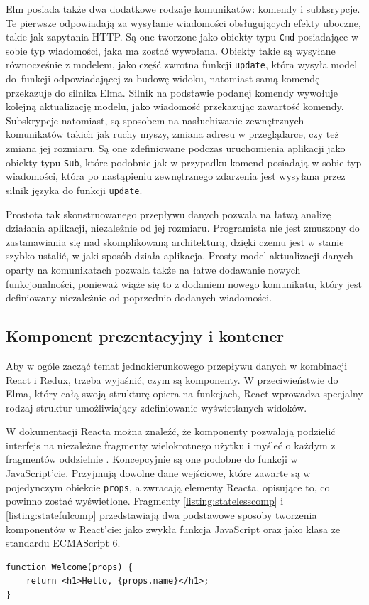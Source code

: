 Elm posiada także dwa dodatkowe rodzaje komunikatów: komendy i subksrypcje. Te pierwsze odpowiadają za wysyłanie wiadomości obsługujących efekty uboczne, takie jak zapytania HTTP. Są one tworzone jako obiekty typu \lstinline[style=elm-style]{Cmd} posiadające w sobie typ wiadomości, jaka ma zostać wywołana. Obiekty takie są wysyłane równocześnie z modelem, jako część zwrotna funkcji \lstinline{update}, która wysyła model do~funkcji odpowiadającej za budowę widoku, natomiast samą komendę przekazuje do silnika Elma. Silnik na podstawie podanej komendy wywołuje kolejną aktualizację modelu, jako wiadomość przekazując zawartość komendy. Subskrypcje natomiast, są sposobem na nasłuchiwanie zewnętrznych komunikatów takich jak ruchy myszy, zmiana adresu w przeglądarce, czy też zmiana jej rozmiaru. Są one zdefiniowane podczas uruchomienia aplikacji jako obiekty typu \lstinline[style=elm-style]{Sub}, które podobnie jak w przypadku komend posiadają w sobie typ wiadomości, która po nastąpieniu zewnętrznego zdarzenia jest wysyłana przez silnik języka do funkcji \lstinline{update}.

Prostota tak skonstruowanego przepływu danych pozwala na łatwą analizę działania aplikacji, niezależnie od jej rozmiaru. Programista nie jest zmuszony do zastanawiania się nad skomplikowaną architekturą, dzięki czemu jest w stanie szybko ustalić, w jaki sposób działa aplikacja. Prosty model aktualizacji danych oparty na komunikatach pozwala także na łatwe dodawanie nowych funkcjonalności, ponieważ wiąże się to z dodaniem nowego komunikatu, który jest definiowany niezależnie od poprzednio dodanych wiadomości.

\subsection{Komponent prezentacyjny i kontener}
Aby w ogóle zacząć temat jednokierunkowego przepływu danych w kombinacji React i Redux, trzeba wyjaśnić, czym są komponenty. W przeciwieństwie do Elma, który całą swoją strukturę opiera na funkcjach, React wprowadza specjalny rodzaj struktur umożliwiający zdefiniowanie wyświetlanych widoków.

W dokumentacji Reacta można znaleźć, że komponenty pozwalają podzielić interfejs na niezależne fragmenty wielokrotnego użytku i myśleć o każdym z fragmentów oddzielnie \cite{reactDocs}. Koncepcyjnie są one podobne do funkcji w JavaScript'cie. Przyjmują dowolne dane wejściowe, które zawarte są w pojedynczym obiekcie \lstinline{props}, a zwracają elementy Reacta, opisujące to, co powinno zostać wyświetlone. Fragmenty \ref{listing:statelesscomp} i \ref{listing:statefulcomp} przedstawiają dwa podstawowe sposoby tworzenia komponentów w React'cie: jako zwykła funkcja JavaScript oraz jako klasa ze standardu ECMAScript 6.
\newpage %
\begin{lstlisting}[style=JavaScript, caption=Funkcyjny komponent bezstanowy, label=listing:statelesscomp]
function Welcome(props) {
	return <h1>Hello, {props.name}</h1>;
}
\end{lstlisting}

